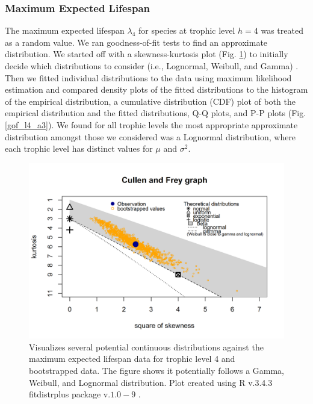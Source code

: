 \documentclass[oneside,12pt,final]{sty/ucthesis-CA2012}
\let\cite\citep                             %
\begin{document}
\begin{mainmatter}
\subsubsection{Maximum Expected Lifespan}
The maximum expected lifespan $\lambda_4$ for species at trophic level $h = 4$ was treated as a random value. We ran goodness-of-fit tests to find an approximate distribution. We started off with a skewness-kurtosis plot (Fig. \ref{cf_l4_a3}) to initially decide which distributions to consider (i.e., Lognormal, Weibull, and Gamma) \cite{fitdistrplus}. Then we fitted individual distributions to the data using maximum likelihood estimation and compared density plots of the fitted distributions to the histogram of the empirical distribution, a cumulative distribution (CDF) plot of both the empirical distribution and the fitted distributions, Q-Q plots, and P-P plots (Fig. \ref{gof_l4_a3}). We found for all trophic levels the most appropriate approximate distribution amongst those we considered was a Lognormal distribution, where each trophic level has distinct values for $\mu$ and $\sigma^2$. 

\begin{figure}[H]
     \centering
       \includegraphics[width=.8\textwidth]{fig/cullen_frey_l4}
    \caption{Visualizes several potential continuous distributions against the maximum expected lifespan data for trophic level 4 and bootstrapped data. The figure shows it potentially follows a Gamma, Weibull, and Lognormal distribution. Plot created using R v.3.4.3 \cite{Rcite} fitdistrplus package v.$1.0-9$ \cite{fitdistrplus}. }
    \label{cf_l4_a3}
\end{figure}


\end{mainmatter}
\end{document}

